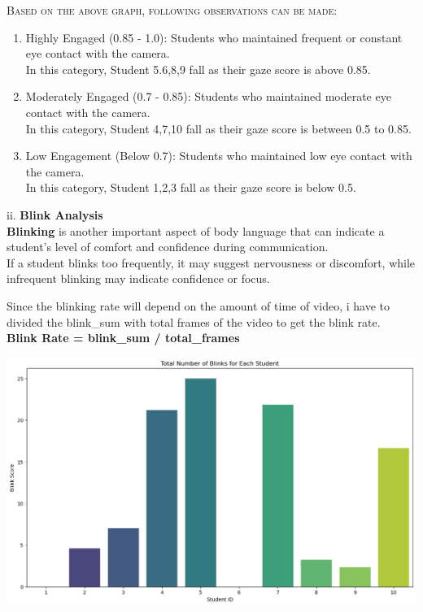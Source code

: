 \documentclass{article}
\begin{document}
\textsc{Based on the above graph, following observations can be made:}
\begin{enumerate}
    \item Highly Engaged (0.85 - 1.0): Students who maintained frequent or constant eye contact with the camera.\\
    {
        In this category, Student 5.6,8,9 fall as their gaze score is above 0.85.
    }
    \item Moderately Engaged (0.7 - 0.85): Students who maintained moderate eye contact with the camera.\\
    {
        In this category, Student 4,7,10 fall as their gaze score is between 0.5 to 0.85.
    }
    \item Low Engagement (Below 0.7): Students who maintained low eye contact with the camera.\\
    {
        In this category, Student 1,2,3 fall as their gaze score is below 0.5.
    }
\end{enumerate}

\vspace{0.3in}
ii. \textbf{Blink Analysis}\\
\textbf{Blinking} is another important aspect of body language that can indicate a student's level of comfort and confidence during communication.\\

If a student blinks too frequently, it may suggest nervousness or discomfort, while infrequent blinking may indicate confidence or focus.\\

\begin{tcolorbox}[colback=yellow!10!white, colframe=red!80!black, title=Catch]
   Since the blinking rate will depend on the amount of time of video, i have to divided the blink_sum with total frames of the video to get the blink rate.\\

   \textbf{Blink Rate = blink\_sum / total\_frames}\\

\end{tcolorbox}
    

\begin{center}
    \includegraphics[width=1\columnwidth]{images/blink.png}
\end{center}
\end{document}
